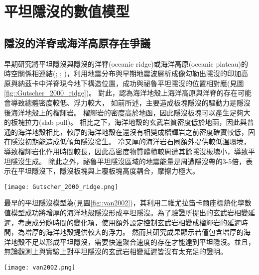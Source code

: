 \section{平坦隱沒的數值模型}
\subsection{隱沒的洋脊或海洋高原存在爭議}
早期研究將平坦隱沒與隱沒的洋脊(oceanic ridge)或海洋高原(oceanic plateau)的時空關係相連結(\citealp{pilger1981plate}; \citealp{henderson1984mesozoic}; \citealp{Gutscher2000A})，\citealp{Gutscher2000A}利用地震分布與早期地震波層析成像勾勒出隱沒的印加高原與納茲卡中洋脊現今地下構造位置，成功與祕魯平坦隱沒的位置相對應(見圖\ref{fig::Gutscher_2000_ridge})。
對此，\citealp{Gutscher2000A}認為海洋地殼上海洋高原與洋脊的存在可能會導致總體密度較低、浮力較大，
如前所述，主要造成板塊隱沒的驅動力是隱沒後海洋地殼上的榴輝岩。
榴輝岩的密度高於地函，因此隱沒板塊可以產生足夠大的板塊拉力(slab pull)。
相比之下，海洋地殼的玄武岩質密度低於地函，因此與普通的海洋地殼相比，較厚的海洋地殼在還沒有相變成榴輝岩之前密度確實較低，固在隱沒初期能造成低傾角隱沒發生。
冷又厚的海洋岩石圈額外提供較低溫環境，導致榴輝岩化作用時間較長，因此高密度物質體積較周遭其餘隱沒板塊小，導致平坦隱沒生成。
除此之外，祕魯平坦隱沒區域的地震能量是周遭隱沒帶的3-5倍，表示在平坦隱沒下，隱沒板塊與上覆板塊高度耦合，摩擦力極大。
\begin{figure*}[ht!]
    \centering
    \texttt{[image: Gutscher\_2000\_ridge.png]}
    \caption{南美洲板塊構造圖，摘自\citealp{Gutscher2000A}。粗支架線標出平坦隱沒段，灰色陰影區標示隱沒的海洋高原與洋脊，三角形為活動火山。板塊聚合速率參考自\citealp{demets1990current}。
    }
    \label{fig::Gutscher_2000_ridge}
\end{figure*}

最早的平坦隱沒模型為\citealp{van2002role}(見圖\ref{fig::van2002})，其利用二維尤拉笛卡爾座標熱化學數值模型成功將增厚的海洋地殼隱沒形成平坦隱沒。為了驗證\citealp{Gutscher2000A}所提出的玄武岩相變延遲，\citealp{van2002role}考慮成分隨時間的變化項，使用額外設定控制玄武岩相變成榴輝岩的延遲時間，為增厚的海洋地殼提供較大的浮力。
然而其研究成果顯示若僅包含增厚的海洋地殼不足以形成平坦隱沒，需要快速聚合速度的存在才能達到平坦隱沒。並且，無論觀測上與實驗上對平坦隱沒的玄武岩相變延遲皆沒有太充足的證明。

\begin{figure*}[ht!]
    \centering
    \texttt{[image: van2002.png]}
    \caption{正常的隱沒帶(左)與包含海洋高原的隱沒帶(右)隨模型時間變化，摘自\citealp{van2002role}。黑白區域繪出海洋地殼的化學成分從玄武岩(黑)到榴輝岩(白)的變化。水平軸為與海溝的距離，背景顏色為溫度。
    }
    \label{fig::van2002}
\end{figure*}

